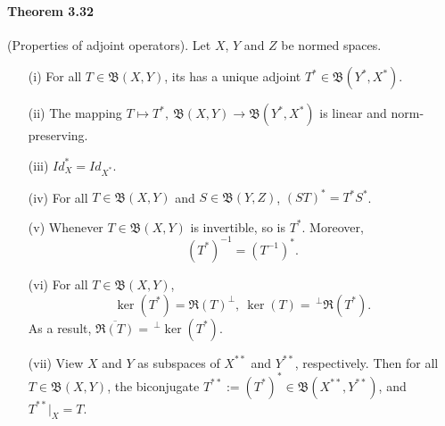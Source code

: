 \documentclass{article}
\begin{document}
\paragraph{Theorem 3.32\label{thm:3.32}} (Properties of adjoint operators). Let $X$, $Y$ and $Z$ be normed spaces.
\begin{itemize}
	\vspace{0.1cm}
	\item[(i)] For all $T\in\mathfrak{B}(X,Y)$, its has a unique adjoint $T^*\in\mathfrak{B}(Y^*,X^*)$.
	\vspace{0.1cm}
	\item[(ii)] The mapping $T\mapsto T^*,\ \mathfrak{B}(X,Y)\to\mathfrak{B}(Y^*,X^*)$ is linear and norm-preserving.
	\vspace{0.1cm}
	\item[(iii)] $Id_X^* = Id_{X^*}$.
	\vspace{0.1cm}
	\item[(iv)] For all $T\in\mathfrak{B}(X,Y)$ and $S\in\mathfrak{B}(Y,Z)$, $(S T)^* = T^* S^*$.
	\item[(v)] Whenever $T\in\mathfrak{B}(X,Y)$ is invertible, so is $T^*$. Moreover, $$(T^*)^{-1}=(T^{-1})^*.$$
	\item[(vi)] For all $T\in\mathfrak{B}(X,Y)$, $$\ker(T^*) = \mathfrak{R}(T)^\perp,\ \ker(T) =\, ^\perp\mathfrak{R}(T^*).$$
	As a result, $\overline{\mathfrak{R}(T)} =\, ^\perp\ker(T^*)$.
	\vspace{0.1cm}
	\item[(vii)] View $X$ and $Y$ as subspaces of $X^{**}$ and $Y^{**}$, respectively. Then for all $T\in\mathfrak{B}(X,Y)$, the biconjugate $T^{**} := (T^*)^* \in\mathfrak{B}(X^{**},Y^{**})$, and $T^{**}|_X = T$.
\end{itemize}
\end{document}
